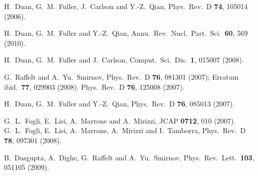 \documentclass[twocolumn,prd,showpacs,
floatfix,preprintnumbers,nofootinbib]{revtex4}
\begin{document}
\begin{thebibliography}{00}

  H.~Duan, G.~M.~Fuller, J.~Carlson and Y.-Z.~Qian,
  Phys.\ Rev.\  D {\bf 74}, 105014 (2006).

  H.~Duan, G.~M.~Fuller and Y.-Z.~Qian,
  Annu.\ Rev.\ Nucl.\ Part.\ Sci.\ {\bf 60}, 569 (2010).

  H.~Duan, G.~M.~Fuller and J.~Carlson,
  Comput.\ Sci.\ Dis.\  {\bf 1}, 015007 (2008).

  G.~Raffelt and A.~Yu.~Smirnov,
  Phys.\ Rev.\  D {\bf 76}, 081301 (2007);
  Erratum ibid.\ {\bf 77}, 029903 (2008).
%
  Phys.\ Rev.\ D {\bf 76}, 125008 (2007).

  H.~Duan, G.~M.~Fuller and Y.-Z.~Qian,
  Phys.\ Rev.\  D {\bf 76}, 085013 (2007).

  G.~L.~Fogli, E.~Lisi, A.~Marrone and A.~Mirizzi,
  JCAP {\bf 0712}, 010 (2007).
%
  G.~L.~Fogli, E.~Lisi, A.~Marrone, A.~Mirizzi and I.\ Tamborra,
  Phys.\ Rev.\  D {\bf 78}, 097301 (2008).

  B.~Dasgupta, A.~Dighe, G.~Raffelt and A.\ Yu.\ Smir\-nov,
  Phys.\ Rev.\ Lett.\  {\bf 103}, 051105 (2009).


\end{thebibliography}
\end{document}
